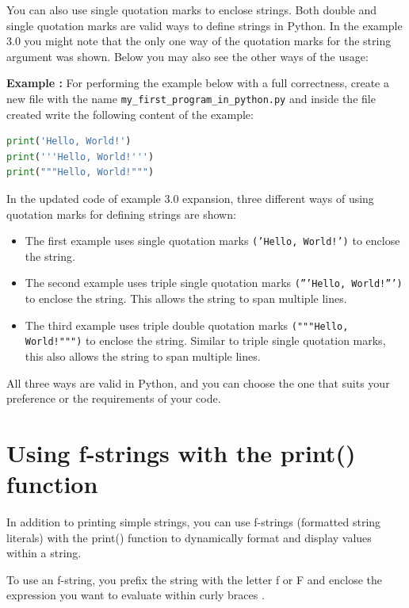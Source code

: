 \documentclass[12pt]{book}
\newtheorem{Example}{Example}[chapter]
\renewenvironment{Example}{\begin{trivlist}\item\relax
\textbf{Example \thesection: }}{\end{trivlist}}
\begin{document}
You can also use single quotation marks to enclose strings. Both double and single quotation marks are valid ways to define strings in Python. In the example 3.0 you might note that the only one way of the quotation marks for the string argument was shown. Below you may also see the other ways of the usage:
\begin{Example}
For performing the example below with a full correctness, create a new file with the name \texttt{my\_first\_program\_in\_python.py} and inside the file created write the following content of the example: 
\begin{lstlisting}[language=Python]
print('Hello, World!')
print('''Hello, World!''')
print("""Hello, World!""")
\end{lstlisting}
\end{Example}

In the updated code of example 3.0 expansion, three different ways of using quotation marks for defining strings are shown:

\begin{itemize}
    \item The first example uses single quotation marks \texttt{('Hello, World!')} to enclose the string.
    \item The second example uses triple single quotation marks \texttt{('''Hello, World!''')} to enclose the string. This allows the string to span multiple lines.
    \item The third example uses triple double quotation marks \texttt{("""Hello, World!""")} to enclose the string. Similar to triple single quotation marks, this also allows the string to span multiple lines.
\end{itemize}

All three ways are valid in Python, and you can choose the one that suits your preference or the requirements of your code.



\section{Using f-strings with the print() function}
In addition to printing simple strings, you can use f-strings (formatted string literals) with the print() function to dynamically format and display values within a string.

To use an f-string, you prefix the string with the letter f or F and enclose the expression you want to evaluate within curly braces {}.
\end{document}
